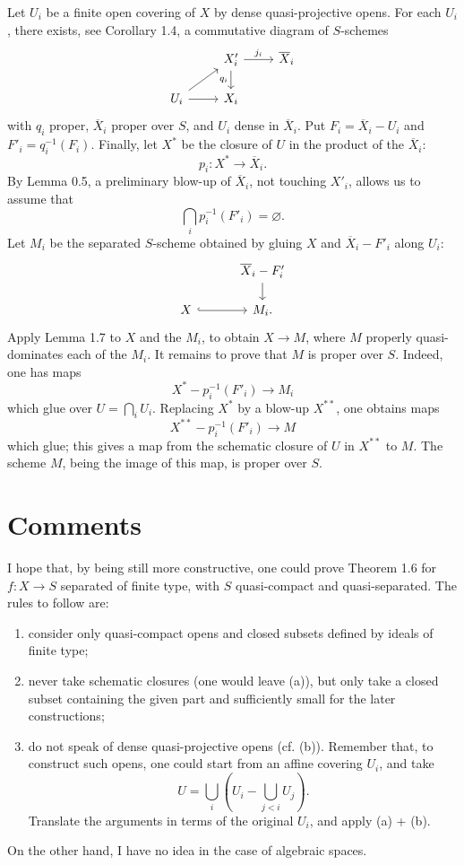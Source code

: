 \documentclass[10pt,a4paper]{article}
\theoremstyle{deligne}
\begin{document}
Let \(U_i\) be a finite open covering of \(X\) by dense quasi-projective opens. For each \(U_i\), there exists, see Corollary 1.4, a commutative diagram of \(S\)-schemes
\[
\begin{tikzcd}[column sep=2.4em,row sep=1.5em]
& X'_i \arrow[r,"j_i"] \arrow[d,"q_i"'] & \overline X_i \\
U_i \arrow[ur] \arrow[r] & X_i
\end{tikzcd}
\]
with \(q_i\) proper, \(\overline X_i\) proper over \(S\), and \(U_i\) dense in \(\overline X_i\). Put \(F_i=\overline X_i-U_i\) and \(F'_i=q_i^{-1}(F_i)\). Finally, let \(X^*\) be the closure of \(U\) in the product of the \(\overline X_i\):
\[
p_i:X^*\longrightarrow\overline X_i.
\]
By Lemma 0.5, a preliminary blow-up of \(\overline X_i\), not touching \(X'_i\), allows us to assume that
\[
\bigcap_i p_i^{-1}(F'_i)=\varnothing.
\]
Let \(M_i\) be the separated \(S\)-scheme obtained by gluing \(X\) and \(\overline X_i-F'_i\) along \(U_i\):
\[
\begin{tikzcd}[column sep=3em,row sep=1.4em]
& \overline X_i-F'_i \arrow[d] \\
X \arrow[r,hook] & M_i .
\end{tikzcd}
\]
Apply Lemma 1.7 to \(X\) and the \(M_i\), to obtain \(X\to M\), where \(M\) properly quasi-dominates each of the \(M_i\). It remains to prove that \(M\) is proper over \(S\). Indeed, one has maps
\[
X^*-p_i^{-1}(F'_i)\longrightarrow M_i
\]
which glue over \(U=\bigcap_iU_i\). Replacing \(X^*\) by a blow-up \(X^{**}\), one obtains maps
\[
X^{**}-p_i^{-1}(F'_i)\longrightarrow M
\]
which glue; this gives a map from the schematic closure of \(U\) in \(X^{**}\) to \(M\). The scheme \(M\), being the image of this map, is proper over \(S\).

\section*{Comments}

I hope that, by being still more constructive, one could prove Theorem 1.6 for \(f:X\to S\) separated of finite type, with \(S\) quasi-compact and quasi-separated. The rules to follow are:
\begin{enumerate}[label=(\alph*)]
\item consider only quasi-compact opens and closed subsets defined by ideals of finite type;
\item never take schematic closures (one would leave (a)), but only take a closed subset containing the given part and sufficiently small for the later constructions;
\item do not speak of dense quasi-projective opens (cf. (b)). Remember that, to construct such opens, one could start from an affine covering \(U_i\), and take
\[
U=\bigcup_i\left(U_i-\bigcup_{j<i}U_j\right).
\]
Translate the arguments in terms of the original \(U_i\), and apply (a) + (b).
\end{enumerate}
On the other hand, I have no idea in the case of algebraic spaces.
\end{document}
